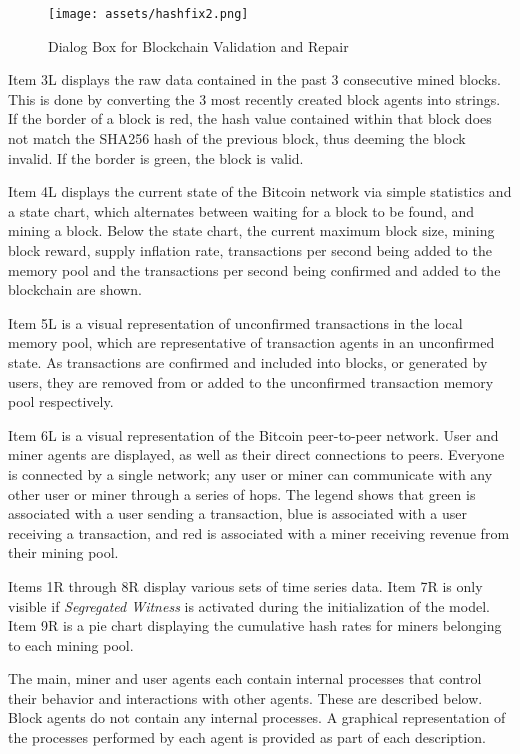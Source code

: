 \documentclass[12pt]{report}
\begin{document}
\begin{figure}[h!]
\texttt{[image: assets/hashfix2.png]}
\caption{Dialog Box for Blockchain Validation and Repair}
\label{fig:hashfix}
\end{figure}


Item 3L displays the raw data contained in the past 3 consecutive mined blocks. This is done by converting the 3 most recently created block agents into strings. If the border of a block is red, the hash value contained within that block does not match the SHA256 hash of the previous block, thus deeming the block invalid. If the border is green, the block is valid.

Item 4L displays the current state of the Bitcoin network via simple statistics and a state chart, which alternates between waiting for a block to be found, and mining a block. Below the state chart, the current maximum block size, mining block reward, supply inflation rate, transactions per second being added to the memory pool and the transactions per second being confirmed and added to the blockchain are shown.

Item 5L is a visual representation of unconfirmed transactions in the local memory pool, which are representative of transaction agents in an unconfirmed state. As transactions are confirmed and included into blocks, or generated by users, they are removed from or added to the unconfirmed transaction memory pool respectively.

Item 6L is a visual representation of the Bitcoin peer-to-peer network. User and miner agents are displayed, as well as their direct connections to peers. Everyone is connected by a single network; any user or miner can communicate with any other user or miner through a series of hops. The legend shows that green is associated with a user sending a transaction, blue is associated with a user receiving a transaction, and red is associated with a miner receiving revenue from their mining pool. 
 
Items 1R through 8R display various sets of time series data. Item 7R is only visible if \textit{Segregated Witness} is activated during the initialization of the model. Item 9R is a pie chart displaying the cumulative hash rates for miners belonging to each mining pool.

The main, miner and user agents each contain internal processes that control their behavior and interactions with other agents. These are described below. Block agents do not contain any internal processes. A graphical representation of the processes performed by each agent is provided as part of each description.
\end{document}
